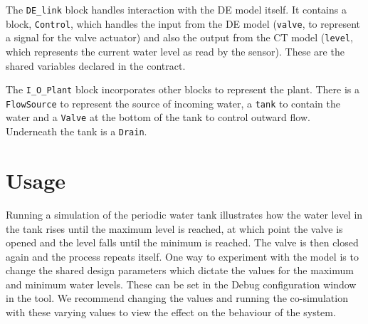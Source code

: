 The \texttt{DE\_link} block handles interaction with the DE
model itself.  It contains a block, \texttt{Control}, which handles
the input from the DE model (\texttt{valve}, to represent a signal for
the valve actuator) and also the output from the CT model
(\texttt{level}, which represents the current water level as read by
the sensor).  These are the shared variables declared in the contract.

The \texttt{I\_O\_Plant} block incorporates other blocks to
represent the plant.  There is a \texttt{Flow\-Sour\-ce} to represent the
source of incoming water, a \texttt{tank} to contain the water and a
\texttt{Valve} at the bottom of the tank to control outward flow.
Underneath the tank is a \texttt{Drain}.

\section{Usage}
Running a simulation of the periodic water tank illustrates how
the water level in the tank rises until the maximum level is reached,
at which point the valve is opened and the level falls until the
minimum is reached.  The valve is then closed again and the process
repeats itself.  One way to experiment with the model is to change the
shared design parameters which dictate the values for the maximum and
minimum water levels.  These can be set in the Debug configuration
window in the \DESTECS tool.  We recommend changing the values and
running the co-simulation with these varying values to view the effect
on the behaviour of the system.
